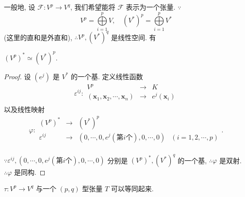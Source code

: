 \documentclass{ctexart}
\begin{document}
一般地, 设 $\mathcal{F}:V^p\to V^q$, 我们希望能将 $\mathcal{F}$ 表示为一个张量. $\because$
\[V^p=\bigoplus\limits_{i=1}^pV,\quad (V^*)^p=\bigoplus\limits_{i=1}^pV^*\]
(这里的直和是外直和), $\therefore V^p,(V^*)^q$ 是线性空间. 有
\begin{lemma}\label{l1.1}
    $(V^p)^*\simeq(V^*)^p$.
\end{lemma}
\begin{proof}
    设 $(e^j)$ 是 $V^*$ 的一个基. 定义线性函数
    \[\varepsilon^{ij}:\begin{array}{rcl}
        V^p & \to & K \\
        (\boldsymbol{x}_1,\boldsymbol{x}_2,\cdots,\boldsymbol{x}_n) & \to & e^j(\boldsymbol{x}_i) \\
    \end{array}\]
    以及线性映射
    \[\varphi:\begin{array}{rcll}
        (V^p)^* & \to & (V^*)^p \\
        \varepsilon^{ij} & \to & (0,\cdots,0,e^j(\text{第}i\text{个}),0,\cdots,0) & (i=1,2,\cdots,p) \\
    \end{array}.\]

    $\because\varepsilon^{ij},(0,\cdots,0,e^j(\text{第}i\text{个}),0,\cdots,0)$ 分别是 $(V^p)^*,(V^*)^q$ 的一个基, $\therefore\varphi$ 是双射. $\therefore\varphi$ 是同构.
\end{proof}
\begin{theorem}\label{t1.3}
    $\tau:V^p\to V^q$ 与一个 $(p,q)$ 型张量 $T$ 可以等同起来.
\end{theorem}
\end{document}
